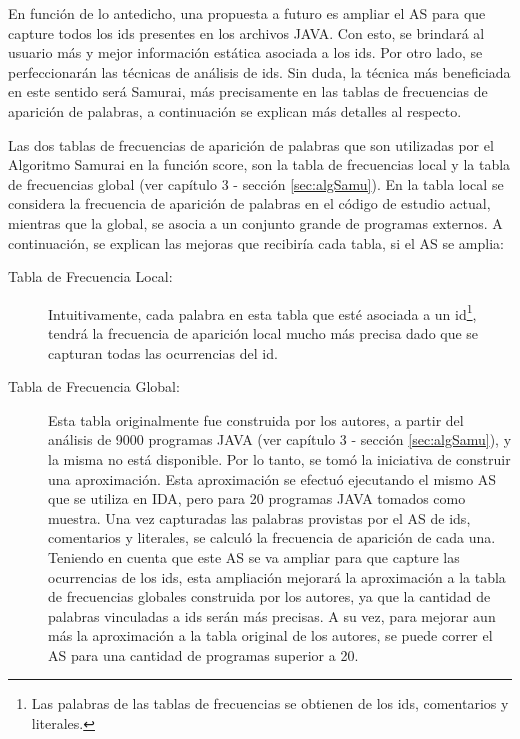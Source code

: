 En función de lo antedicho, una propuesta a futuro es ampliar el AS para que capture todos los ids presentes en los archivos JAVA. Con esto, se brindará al usuario más y mejor información estática asociada a los ids. Por otro lado, se perfeccionarán las técnicas de análisis de ids. 
Sin duda, la técnica más beneficiada en este sentido será Samurai, más precisamente en las tablas de frecuencias de aparición de palabras, a continuación se explican más detalles al respecto.

Las dos tablas de frecuencias de aparición de palabras que son utilizadas por el Algoritmo Samurai en la función score, son la tabla de frecuencias local y la tabla de frecuencias global (ver capítulo 3 - sección \ref{sec:algSamu}). 
En la tabla local se considera la frecuencia de aparición de palabras en el código de estudio actual, mientras que la global, se asocia a un conjunto grande de programas externos. A continuación, se explican las mejoras que recibiría cada tabla, si el AS se amplia:

\begin{description}
\item[Tabla de Frecuencia Local:] Intuitivamente, cada palabra en esta tabla que esté asociada a un id\footnote[1]{Las palabras de las tablas de frecuencias se obtienen de los ids, comentarios y literales.}, tendrá la frecuencia de aparición local mucho más precisa dado que se capturan todas las ocurrencias del id.

\item[Tabla de Frecuencia Global:] Esta tabla originalmente fue construida por los autores, a partir del análisis de 9000 programas JAVA (ver capítulo 3 - sección \ref{sec:algSamu}), y la misma no está disponible. Por lo tanto, se tomó la iniciativa de construir una aproximación. Esta aproximación se efectuó ejecutando el mismo AS que se utiliza en IDA, pero para 20 programas JAVA tomados como muestra. Una vez capturadas las palabras provistas por el AS de ids, comentarios y literales, se calculó la frecuencia de aparición de cada una.
Teniendo en cuenta que este AS se va ampliar para que capture las ocurrencias de los ids, esta ampliación mejorará la aproximación a la tabla de frecuencias globales construida por los autores, ya que la cantidad de palabras vinculadas a ids serán más precisas. A su vez, para mejorar aun más la aproximación a la tabla original de los autores, se puede correr el AS para una cantidad de programas superior a 20.

\end{description}

